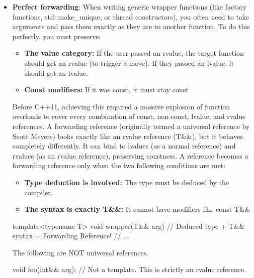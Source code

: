 \documentclass{report}
\begin{document}
\begin{itemize}
\begin{cppcode}
{                    std::vector<int> internal1 = param;             // TRAP: Triggers a COPY constructor!
                    std::vector<int> internal2 = std::move(param);  // CORRECT: Triggers the MOVE constructor.
                }
            \end{cppcode}
        \item \textbf{Perfect forwarding}: When writing generic wrapper functions (like factory functions, std::make\_unique, or thread constructors), you often need to take arguments and pass them exactly as they are to another function.
            \bigbreak \noindent 
            To do this perfectly, you must preserve:
            \begin{itemize}
                \item \textbf{The value category:} If the user passed an rvalue, the target function should get an rvalue (to trigger a move). If they passed an lvalue, it should get an lvalue.
                \item \textbf{Const modifiers:} If it was const, it must stay const
            \end{itemize}
            Before C++11, achieving this required a massive explosion of function overloads to cover every combination of const, non-const, lvalue, and rvalue references.
            \bigbreak \noindent 
            A forwarding reference (originally termed a universal reference by Scott Meyers) looks exactly like an rvalue reference (T\&\&), but it behaves completely differently. It can bind to lvalues (as a normal reference) and rvalues (as an rvalue reference), preserving constness.
            \bigbreak \noindent 
            A reference becomes a forwarding reference only when the two following conditions are met:
            \begin{itemize}
                \item \textbf{Type deduction is involved:} The type must be deduced by the compiler.
                \item \textbf{The syntax is exactly T\&\&:} It cannot have modifiers like const T\&\&
            \end{itemize}
            \bigbreak \noindent 
            \begin{cppcode}
                template<typename T>
                void wrapper(T&& arg) { // Deduced type + T&& syntax = Forwarding Reference!
                    // ...
                }
            \end{cppcode}
            \bigbreak \noindent 
            The following are NOT universal references.
            \bigbreak \noindent 
            \begin{cppcode}
                void foo(int&& arg); // Not a template. This is strictly an rvalue reference.


\end{cppcode}
\end{itemize}
\end{document}
